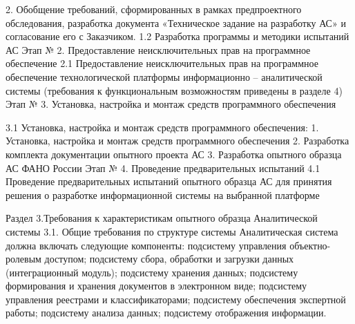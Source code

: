 2. Обобщение требований, сформированных в рамках предпроектного обследования, разработка документа «Техническое задание на разработку АС» и согласование его с Заказчиком.
1.2
Разработка программы и методики испытаний  АС 
Этап № 2. Предоставление неисключительных прав на программное обеспечение
2.1
Предоставление  неисключительных прав на программное обеспечение технологической платформы информационно – аналитической системы (требования к функциональным возможностям приведены в разделе 4)
Этап № 3. Установка, настройка и монтаж средств программного обеспечения


3.1
Установка, настройка и монтаж средств программного обеспечения:
1. Установка, настройка и монтаж средств программного обеспечения
2. Разработка комплекта документации опытного проекта АС 
3. Разработка опытного образца АС ФАНО России
Этап № 4. Проведение предварительных испытаний
4.1
Проведение предварительных испытаний опытного образца АС для принятия решения о разработке информационной системы на выбранной платформе


Раздел 3.Требования к характеристикам опытного образца Аналитической системы 
3.1. Общие требования по структуре системы
Аналитическая система должна включать следующие компоненты:
подсистему управления объектно-ролевым доступом;
подсистему сбора, обработки и загрузки данных (интеграционный модуль);
подсистему хранения данных;
подсистему формирования и хранения документов в электронном виде;
подсистему управления реестрами и классификаторами;
подсистему обеспечения экспертной работы; 
подсистему анализа данных;
подсистему отображения информации.
 
